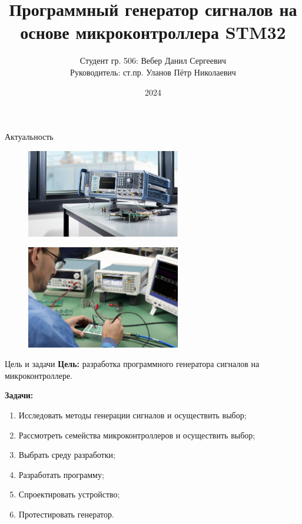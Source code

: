 \documentclass[10pt]{beamer}
\begin{document}
\title{Программный генератор сигналов на основе микроконтроллера STM32}
\author{Студент гр. 506: Вебер Данил Сергеевич\\Руководитель:  ст.пр. Уланов Пётр Николаевич}
\date{2024}


\frame{\titlepage}

\begin{frame}{Актуальность}
  \begin{figure}
  \includegraphics[width=0.6\textwidth]{actual1}
  \end{figure}
  
  \begin{figure}
  \includegraphics[width=0.6\textwidth]{actual2}
  \end{figure}
\end{frame}

\begin{frame}{Цель и задачи}
  \textbf{Цель:} разработка программного генератора сигналов на микроконтроллере.

  \textbf{Задачи:} 
	\begin{enumerate}
		\item Исследовать методы генерации сигналов и осуществить выбор;
		\item Рассмотреть семейства микроконтроллеров и осуществить выбор;
		\item Выбрать среду разработки;
		\item Разработать программу;
		\item Спроектировать устройство;
		\item Протестировать генератор.
	\end{enumerate}
\end{frame}
\end{document}
